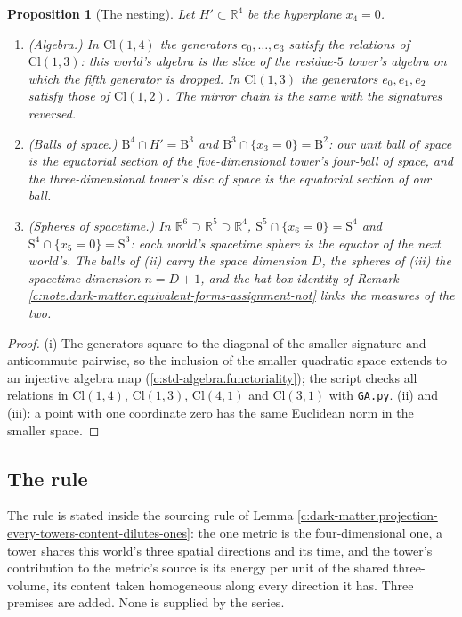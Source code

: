\documentclass[11pt]{article}
\newtheorem{proposition}[theorem]{Proposition}
\theoremstyle{definition}
\theoremstyle{plain}
\newcommand{\changedmark}[2]{\marginpar{\raggedright\scriptsize\color{#1}#2}}
\providecommand{\B}{}\renewcommand{\B}{\mathrm{B}}
\providecommand{\Cl}{}\renewcommand{\Cl}{\mathrm{Cl}}
\providecommand{\R}{}\renewcommand{\R}{\mathbb{R}}
\providecommand{\Sph}{}\renewcommand{\Sph}{\mathrm{S}}
\begin{document}
\begin{proposition}[The nesting]\label{c:dark-matter.nesting}
\changedmark{gray}{reworded}
Let $H' \subset \R^{4}$ be the hyperplane $x_{4} = 0$.
\begin{enumerate}
\item[(i)] (Algebra.) In $\Cl(1,4)$ the generators $e_{0}, \ldots, e_{3}$ satisfy the relations of $\Cl(1,3)$: this world's algebra is the slice of the residue-$5$ tower's algebra on which the fifth generator is dropped. In $\Cl(1,3)$ the generators $e_{0}, e_{1}, e_{2}$ satisfy those of $\Cl(1,2)$. The mirror chain is the same with the signatures reversed.
\item[(ii)] (Balls of space.) $\B^{4} \cap H' = \B^{3}$ and $\B^{3} \cap \{x_{3} = 0\} = \B^{2}$: our unit ball of space is the equatorial section of the five-dimensional tower's four-ball of space, and the three-dimensional tower's disc of space is the equatorial section of our ball.
\item[(iii)] (Spheres of spacetime.) In $\R^{6} \supset \R^{5} \supset \R^{4}$, $\Sph^{5} \cap \{x_{6} = 0\} = \Sph^{4}$ and $\Sph^{4} \cap \{x_{5} = 0\} = \Sph^{3}$: each world's spacetime sphere is the equator of the next world's. The balls of (ii) carry the space dimension $D$, the spheres of (iii) the spacetime dimension $n = D + 1$, and the hat-box identity of Remark \ref{c:note.dark-matter.equivalent-forms-assignment-not} links the measures of the two.
\end{enumerate}
\end{proposition}
\begin{proof}
(i) The generators square to the diagonal of the smaller signature and anticommute pairwise, so the inclusion of the smaller quadratic space extends to an injective algebra map (\ref{c:std-algebra.functoriality}); the script checks all relations in $\Cl(1,4)$, $\Cl(1,3)$, $\Cl(4,1)$ and $\Cl(3,1)$ with \texttt{GA.py}. (ii) and (iii): a point with one coordinate zero has the same Euclidean norm in the smaller space.

\end{proof}

\subsection*{The rule}
\label{c:note.dark-matter.setting-rule}
The rule is stated inside the sourcing rule of Lemma \ref{c:dark-matter.projection-every-towers-content-dilutes-ones}: the one metric is the four-dimensional one, a tower shares this world's three spatial directions and its time, and the tower's contribution to the metric's source is its energy per unit of the shared three-volume, its content taken homogeneous along every direction it has. Three premises are added. None is supplied by the series.
\end{document}
